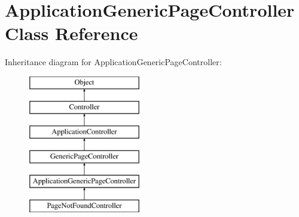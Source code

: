 \hypertarget{class_application_generic_page_controller}{
\section{ApplicationGenericPageController Class Reference}
\label{class_application_generic_page_controller}
}
Inheritance diagram for ApplicationGenericPageController:\begin{figure}[H]
\begin{center}
\leavevmode
\includegraphics[height=6.000000cm]{class_application_generic_page_controller}
\end{center}
\end{figure}
